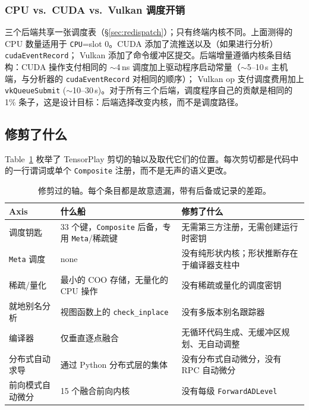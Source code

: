 \subsubsection{CPU vs.\ CUDA vs.\ Vulkan 调度开销}

三个后端共享一张调度表（\S\ref{sec:redispatch}）；只有终端内核不同。上面测得的 CPU 数量适用于 \texttt{CPU}=slot 0。CUDA 添加了流推送以及（如果进行分析）\texttt{cudaEventRecord}； Vulkan 添加了命令缓冲区提交。后端增量遵循内核条目结构：CUDA 操作支付相同的 $\sim$4\,ns 调度加上驱动程序启动常量（$\sim$5--10\,\textmu s 主机端，与分析器的 \texttt{cudaEventRecord} 对相同的顺序）； Vulkan op 支付调度费用加上 \texttt{vkQueueSubmit} ($\sim$10--30\,\textmu s)。对于所有三个后端，调度程序自己的贡献是相同的 1\% 条子，这是设计目标：后端选择改变内核，而不是调度路径。

\subsection{修剪了什么}
\label{subsec:eval-trimmed}

Table~\ref{tab:trimmed} 枚举了 TensorPlay 剪切的轴以及取代它们的位置。每次剪切都是代码中的一行谓词或单个 \texttt{Composite} 注册，而不是无声的语义更改。

\begin{table}[H]
\centering
\caption{修剪过的轴。每个条目都是故意遗漏，带有后备或记录的差距。}
\label{tab:trimmed}
\small
\begin{tabular}{lll}
\toprule
Axis & 什么船 & 修剪了什么 \\
\midrule
调度钥匙 & 33 个键，\texttt{Composite} 后备，专用 \texttt{Meta}/稀疏键 & 无需第三方注册，无需创建运行时密钥 \\
\texttt{Meta} 调度 & none & 没有纯形状内核；形状推断存在于编译器支柱中 \\
稀疏/量化 & 最小的 COO 存储，无量化的 CPU 操作 & 没有稀疏或量化的调度密钥 \\
就地别名分析 & 视图函数上的 \texttt{check\_inplace} & 没有多版本别名跟踪器 \\
编译器 & 仅垂直逐点融合 & 无循环代码生成、无缓冲区规划、无自动调整 \\
分布式自动求导 & 通过 Python 分布式层的集体 & 没有分布式自动微分，没有 RPC 自动微分 \\
前向模式自动微分 & 15 个融合前向内核 & 没有每级 \texttt{ForwardADLevel} \\
\bottomrule
\end{tabular}
\end{table}

